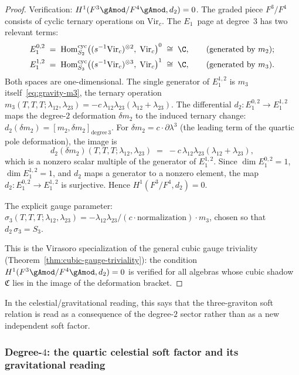 \begin{proof}
Verification: $H^1(F^3\gAmod/F^4\gAmod, d_2) = 0$.
The graded piece $F^3/F^4$ consists of cyclic ternary
operations on $\mathrm{Vir}_c$. The $E_1$~page at degree~$3$
has two relevant terms:
\begin{align*}
E_1^{0,2}
&\;=\;
\operatorname{Hom}_{S_2}^{\mathrm{cyc}}\!
\left(
 (s^{-1}\mathrm{Vir}_c)^{\otimes 2},\;
 \mathrm{Vir}_c
\right)^0
\;\cong\; \C,
\qquad
\text{(generated by $m_2$)}; \\
E_1^{1,2}
&\;=\;
\operatorname{Hom}_{S_3}^{\mathrm{cyc}}\!
\left(
 (s^{-1}\mathrm{Vir}_c)^{\otimes 3},\;
 \mathrm{Vir}_c
\right)^1
\;\cong\; \C,
\qquad
\text{(generated by $m_3$)}.
\end{align*}
Both spaces are one-dimensional. The single generator
of $E_1^{1,2}$ is $m_3$ itself~\eqref{eq:gravity-m3},
the ternary operation
$m_3(T,T,T;\lambda_{12},\lambda_{23})
= -c\,\lambda_{12}\lambda_{23}(\lambda_{12}+\lambda_{23})$.
The differential
$d_2 \colon E_1^{0,2} \to E_1^{1,2}$ maps the
degree-$2$ deformation $\delta m_2$ to the induced ternary
change: $d_2(\delta m_2) = [m_2, \delta m_2]_{\mathrm{degree}\,3}$.
For $\delta m_2 = c \cdot \partial\lambda^3$ (the leading term
of the quartic pole deformation), the image is
\[
d_2(\delta m_2)(T,T,T;\lambda_{12},\lambda_{23})
\;=\;
-c\,\lambda_{12}\lambda_{23}(\lambda_{12}+\lambda_{23}),
\]
which is a nonzero scalar multiple of the generator of
$E_1^{1,2}$. Since $\dim E_1^{0,2} = 1$,
$\dim E_1^{1,2} = 1$, and $d_2$ maps a generator to a
nonzero element, the map $d_2 \colon E_1^{0,2} \to E_1^{1,2}$
is surjective. Hence $H^1(F^3/F^4, d_2) = 0$.

The explicit gauge parameter: $\sigma_3(T,T,T;\lambda_{12},
\lambda_{23}) = -\lambda_{12}\lambda_{23}/(c\cdot\text{normalization})
\cdot m_3$, chosen so that $d_2\,\sigma_3 = S_3$.

This is the Virasoro specialization of the general cubic gauge
triviality (Theorem~\ref{thm:cubic-gauge-triviality}): the
condition $H^1(F^3\gAmod/F^4\gAmod, d_2) = 0$ is verified
for all algebras whose cubic shadow $\mathfrak{C}$ lies in the
image of the deformation bracket.
\end{proof}

In the celestial/gravitational reading, this says that the
three-graviton soft relation is read as a consequence of the
degree-$2$ sector rather than as a new independent soft factor.

\subsubsection*{Degree-$4$: the quartic celestial soft factor and its gravitational reading}

